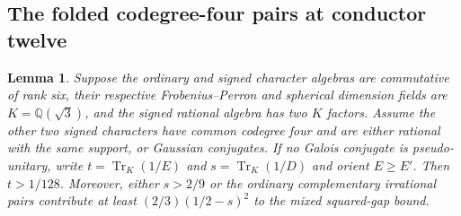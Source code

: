 \documentclass[11pt,reqno]{amsart}
\newtheorem{lemma}[theorem]{Lemma}
\theoremstyle{remark}\newtheorem{remark}[theorem]{Remark}
\numberwithin{equation}{section}
\begin{document}
\subsection{The folded codegree-four pairs at conductor twelve}
\begin{lemma}\label{lem:folded-twelve-mass}
Suppose the ordinary and signed character algebras are commutative
of rank six, their respective Frobenius--Perron and spherical
dimension fields are $K=\mathbb Q(\sqrt3)$, and the signed
rational algebra has two $K$ factors. Assume the other two
signed characters have common codegree four and are either rational
with the same support, or Gaussian conjugates. If no Galois
conjugate is pseudo-unitary, write $t=\operatorname{Tr}_K(1/E)$ and
$s=\operatorname{Tr}_K(1/D)$ and orient $E\ge E'$. Then
$t>1/128$. Moreover, either $s>2/9$ or the ordinary complementary
irrational pairs contribute at least $(2/3)(1/2-s)^2$ to the
mixed squared-gap bound.
\end{lemma}
\end{document}
